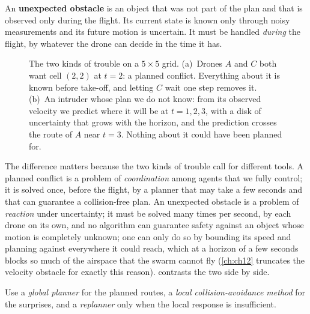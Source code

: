 \begin{definition}
\label{def:ch01-unexpected-obstacle}
An \textbf{unexpected obstacle} is an object that
was not part of the plan and that is observed only during the flight. Its current
state is known only through noisy measurements and its future motion is uncertain. It
must be handled \emph{during} the flight, by whatever the drone can decide in the time
it has.
\end{definition}

\begin{figure}[tb]
  \centering
  \caption{The two kinds of trouble on a $5\times 5$ grid. (a)~Drones $A$ and $C$
    both want cell $(2,2)$ at $t=2$: a planned conflict. Everything about it is
    known before take-off, and letting $C$ wait one step removes it. (b)~An intruder
    whose plan we do not know: from its observed velocity we predict where it will be
    at $t=1,2,3$, with a disk of uncertainty that grows with the horizon, and the
    prediction crosses the route of $A$ near $t=3$. Nothing about it could have been
    planned for.}
  \label{fig:ch01-planned-vs-unexpected}
\end{figure}

The difference matters because the two kinds of trouble call for different tools.
A planned conflict is a problem of \emph{coordination} among agents that we fully
control; it is solved once, before the flight, by a planner that may take a few
seconds and that can guarantee a collision-free plan. An unexpected obstacle is a
problem of \emph{reaction} under uncertainty; it must be solved many times per second,
by each drone on its own, and no algorithm can guarantee safety against an object
whose motion is completely unknown; one can only do so by bounding its speed and
planning against everywhere it could reach, which at a horizon of a few seconds blocks
so much of the airspace that the swarm cannot fly (\cref{ch:ch12} truncates the
velocity obstacle for exactly this reason).
 contrasts the two side by side.

\begin{keyidea}
Use a \emph{global planner} for the planned routes, a \emph{local collision-avoidance
method} for the surprises, and a \emph{replanner} only when the local response is
insufficient.
\end{keyidea}

